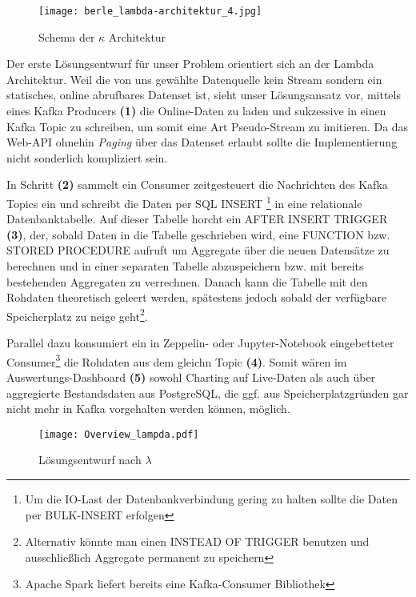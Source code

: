 \begin{description}
\begin{figure}[h]
	\centering
	\texttt{[image: berle\_lambda-architektur\_4.jpg]}
	\caption[Schema der $\kappa$ Architektur]{Schema der $\kappa$ Architektur\citep{TODO}}
	\label{fig:KappaArchitecture}
\end{figure}

\end{description}

Der erste Lösungsentwurf für unser Problem orientiert sich an der Lambda Architektur. Weil die von uns gewählte Datenquelle kein Stream sondern ein statisches, online abrufbares Datenset ist, sieht unser Lösungsansatz vor, mittels eines Kafka Producers \textbf{(1)} die Online-Daten zu laden und sukzessive in einen Kafka Topic zu schreiben, um somit eine Art Pseudo-Stream zu imitieren. Da das Web-API ohnehin \textit{Paging} über das Datenset erlaubt sollte die Implementierung nicht sonderlich kompliziert sein.

In Schritt \textbf{(2)} sammelt ein Consumer zeitgesteuert die Nachrichten des Kafka Topics ein und schreibt die Daten per SQL INSERT \footnote{Um die IO-Last der Datenbankverbindung gering zu halten sollte die Daten per BULK-INSERT erfolgen} in eine relationale Datenbanktabelle. Auf dieser Tabelle horcht ein AFTER INSERT TRIGGER \textbf{(3)}, der, sobald Daten in die Tabelle geschrieben wird, eine FUNCTION bzw. STORED PROCEDURE aufruft um Aggregate über die neuen Datensätze zu berechnen und in einer separaten Tabelle abzuspeichern bzw. mit bereits bestehenden Aggregaten zu verrechnen. Danach kann die Tabelle mit den Rohdaten theoretisch geleert werden, spätestens jedoch sobald der verfügbare Speicherplatz zu neige geht\footnote{Alternativ könnte man einen INSTEAD OF TRIGGER benutzen und ausschließlich Aggregate permanent zu speichern}.

Parallel dazu konsumiert ein in Zeppelin- oder Jupyter-Notebook eingebetteter Consumer\footnote{Apache Spark liefert bereits eine Kafka-Consumer Bibliothek} die Rohdaten aus dem gleichn Topic \textbf{(4)}. Somit wären im Auswertungs-Dashboard \textbf{(5)} sowohl Charting auf Live-Daten als auch über aggregierte Bestandsdaten aus PostgreSQL, die ggf. aus Speicherplatzgründen gar nicht mehr in Kafka vorgehalten werden können, möglich.

\begin{figure}[h] %
	\centering
	\texttt{[image: Overview\_lampda.pdf]}
	\caption[Lösungsentwurf nach $\lambda$]{Lösungsentwurf nach $\lambda$}
	\label{fig:OurLampdaArchitecture}
\end{figure}



